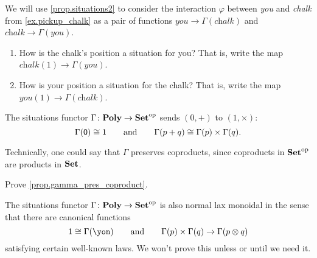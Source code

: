 \documentclass[Book-Poly]{subfiles}
\begin{document}
\begin{exercise}
We will use \cref{prop.situations2} to consider the interaction $\varphi$ between \textit{you} and \textit{chalk} from \cref{ex.pickup_chalk} as a pair of functions $\textit{you}\to\Gamma(\textit{chalk})$ and $\textit{chalk}\to\Gamma(\textit{you})$.
\begin{enumerate}
	\item How is the chalk's position a situation for you? That is, write the map $\textit{chalk}(1)\to\Gamma(\textit{you})$.
	\item How is your position a situation for the chalk? That is, write the map $\textit{you}(1)\to\Gamma(\textit{chalk})$.
\qedhere
\end{enumerate}
\end{exercise}

\begin{proposition}\label{prop.gamma_pres_coproduct}
The situations functor $\Gamma\colon\mathbf{Poly}\to\mathbf{Set}^{\textnormal{op}}$ sends $(0,+)$ to $(1,\times)$:
\[
	\Gamma(\textsf{0})\cong\textsf{1}
	\qquad\text{and}\qquad
	\Gamma(p+q)\cong\Gamma(p)\times\Gamma(q).
\]
\end{proposition}
Technically, one could say that $\Gamma$ preserves coproducts, since coproducts in $\mathbf{Set}^{\textnormal{op}}$ are products in $\mathbf{Set}$.

\begin{exercise}
Prove \cref{prop.gamma_pres_coproduct}.
\end{exercise}



The situations functor $\Gamma\colon\mathbf{Poly}\to\mathbf{Set}^{\textnormal{op}}$ is also normal lax monoidal in the sense that there are canonical functions
\[
	\1\cong\Gamma(\yon)
	\qqand
	\Gamma(p)\times\Gamma(q)\to\Gamma(p\otimes q)
\]
satisfying certain well-known laws. We won't prove this unless or until we need it.
\end{document}
